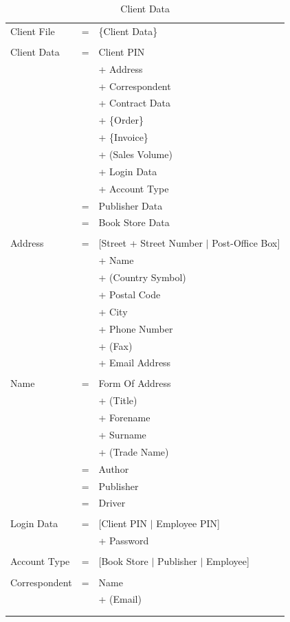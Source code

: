 \documentclass[11pt,a4paper,oneside,svgnames]{report}
\begin{document}
\begin{longtable}{p{3.5cm}p{0.5cm}p{8.5cm}}
Client File & = & \{Client Data\} \\
\\
Client Data & = & Client PIN\\
&  & + Address\\
&  & + Correspondent\\
&  & + Contract Data\\
&  & + \{Order\}\\
&  & + \{Invoice\}\\
&  & + (Sales Volume)\\
&  & + Login Data\\
&  & + Account Type\\
& = & Publisher Data\\
& = & Book Store Data\\
\\
Address & = & [Street + Street Number $|$ Post-Office Box]\\
&  & + Name\\
&  & +  (Country Symbol)\\
&  & +  Postal Code\\
&  & + City\\
&  & + Phone Number\\
&  & + (Fax)\\
&  & + Email Address\\
\\
Name & = & Form Of Address\\
&  & + (Title)\\
&  & + Forename\\
&  & + Surname\\
&  & + (Trade Name)\\
& = & Author\\
& = & Publisher\\
& = & Driver\\
\\
Login Data & = & [Client PIN $|$ Employee PIN]\\
&  & + Password \\
\\
Account Type & = & [Book Store $|$ Publisher $|$ Employee]\\
\\
Correspondent & = & Name\\
&  & + (Email)\\
\hfill\\
\caption{Client Data}\\
\end{longtable}
\end{document}
